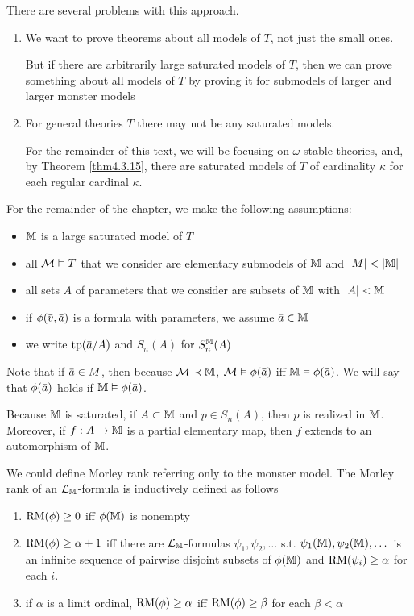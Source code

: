 \documentclass[11pt]{article}
\begin{document}
There are several problems with this approach.
\begin{enumerate}
\item We want to prove theorems about all models of \(T\), not just the small ones.

But if there are arbitrarily large saturated models of \(T\), then we can prove something
about all models of \(T\) by proving it for submodels of larger and larger monster models

\item For general theories \(T\) there may not be any saturated models.

 For the remainder of this text, we will be focusing on \(\omega\)-stable theories, and, by Theorem
 \ref{thm4.3.15}, there are saturated models of \(T\) of cardinality \(\kappa\) for each regular
cardinal \(\kappa\).
\end{enumerate}


For the remainder of the chapter, we make the following assumptions:
\begin{itemize}
\item \(\mathbb{M}\) is a large saturated model of \(T\)
\item all \(\mathcal{M}\vDash T\) that we consider are elementary submodels of \(\mathbb{M}\) and \(\abs{M}<\abs{\M}\)
\item all sets \(A\) of parameters that we consider are subsets of \(\mathbb{M}\) with \(\abs{A}<\M\)
\item if \(\phi(\barv,\bara)\) is a formula with parameters, we assume \(\bara\in\M\)
\item we write \(\tp(\bara/A)\) and \(S_n(A)\) for \(S_n^{\mathbb{M}}(A)\)
\end{itemize}


Note that if \(\bara\in M\), then because \(\mathcal{M}\prec\mathbb{M}\), \(\calm\vDash\phi(\bara)\) iff \(\M\vDash\phi(\bara)\). We will say
that \(\phi(\bara)\) holds if \(\M\vDash\phi(\bara)\).

Because \(\mathbb{M}\) is saturated, if \(A\subset\mathbb{M}\) and \(p\in S_n(A)\), then \(p\) is realized in \(\mathbb{M}\).
Moreover, if \(f:A\to\mathbb{M}\) is a partial elementary map, then \(f\) extends to an automorphism
of \(\mathbb{M}\).

We could define Morley rank referring only to the monster model. The Morley rank of
an \(\mathcal{L}_{\mathbb{M}}\)-formula is inductively defined as follows
\begin{enumerate}
\item \(\operatorname{RM}(\phi)\ge 0\) iff \(\phi(\mathbb{M})\) is nonempty
\item \(\operatorname{RM}(\phi)\ge\alpha+1\) iff there are \(\mathcal{L}_{\mathbb{M}}\)-formulas \(\psi_1,\psi_2,\dots\) s.t. \(\psi_1(\mathbb{M}),\psi_2(\mathbb{M}),\dots\) is an
infinite sequence of pairwise disjoint subsets of \(\phi(\mathbb{M})\) and \(\operatorname{RM}(\psi_i)\ge\alpha\) for each \(i\).
\item if \(\alpha\) is a limit ordinal, \(\operatorname{RM}(\phi)\ge\alpha\) iff \(\operatorname{RM}(\phi)\ge\beta\) for each \(\beta<\alpha\)
\end{enumerate}
\end{document}

